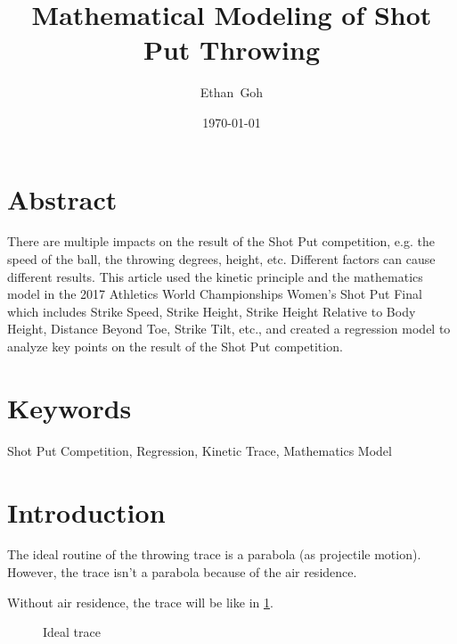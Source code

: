 \documentclass{article}
\title{Mathematical Modeling of Shot Put Throwing}
\author{Ethan\ Goh}
\date{\today}
\begin{document}
\maketitle
\section*{Abstract}
There are multiple impacts on the result of the Shot Put competition, e.g. the speed of the ball, the throwing degrees, height, etc. Different factors can cause different results. This article used the kinetic principle and the mathematics model in the 2017 Athletics World Championships Women's Shot Put Final which includes Strike Speed, Strike Height, Strike Height Relative to Body Height, Distance Beyond Toe, Strike Tilt, etc., and created a regression model to analyze key points on the result of the Shot Put competition.

\section*{Keywords} Shot Put Competition, Regression, Kinetic Trace, Mathematics Model

\tableofcontents

\section{Introduction}

The ideal routine of the throwing trace is a parabola (as projectile motion). However, the trace isn't a parabola because of the air residence.

Without air residence, the trace will be like in \ref{fig:ideal-trace}.

\begin{figure}[H]
    \centering
    \caption{Ideal trace}
    \label{fig:ideal-trace}
\end{figure}
\end{document}
